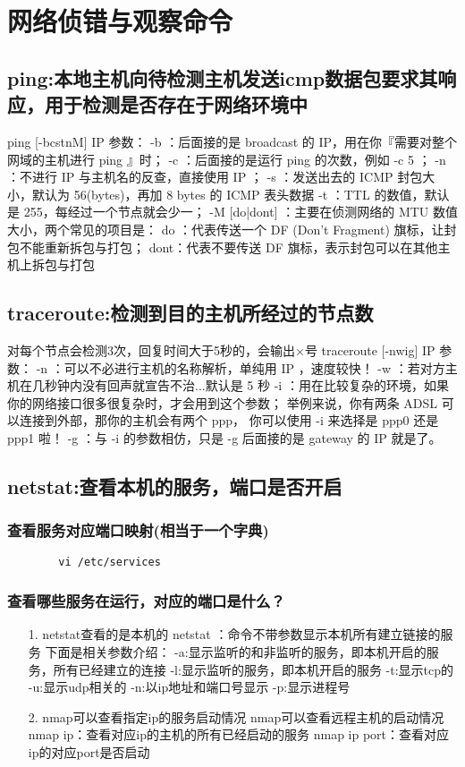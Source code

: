 \documentclass[a4paper,left=1.5cm,right=1.5cm,11pt]{article}
\begin{document}
\section{网络侦错与观察命令}
\subsection{ping:本地主机向待检测主机发送icmp数据包要求其响应，用于检测是否存在于网络环境中}
ping [-bcstnM] IP
参数：
-b ：后面接的是 broadcast 的 IP，用在你『需要对整个网域的主机进行 ping 』时；
-c ：后面接的是运行 ping 的次数，例如 -c 5 ；
-n ：不进行 IP 与主机名的反查，直接使用 IP ；
-s ：发送出去的 ICMP 封包大小，默认为 56(bytes)，再加 8 bytes 的 ICMP 表头数据
-t ：TTL 的数值，默认是 255，每经过一个节点就会少一；
-M [do|dont] ：主要在侦测网络的 MTU 数值大小，两个常见的项目是：
   do  ：代表传送一个 DF (Don't Fragment) 旗标，让封包不能重新拆包与打包；
   dont：代表不要传送 DF 旗标，表示封包可以在其他主机上拆包与打包

\subsection{traceroute:检测到目的主机所经过的节点数}
对每个节点会检测3次，回复时间大于5秒的，会输出×号 
traceroute [-nwig] IP
参数：
-n ：可以不必进行主机的名称解析，单纯用 IP ，速度较快！
-w ：若对方主机在几秒钟内没有回声就宣告不治...默认是 5 秒
-i ：用在比较复杂的环境，如果你的网络接口很多很复杂时，才会用到这个参数；
     举例来说，你有两条 ADSL 可以连接到外部，那你的主机会有两个 ppp，
     你可以使用 -i 来选择是 ppp0 还是 ppp1 啦！
-g ：与 -i 的参数相仿，只是 -g 后面接的是 gateway 的 IP 就是了。

\subsection{netstat:查看本机的服务，端口是否开启}
    \subsubsection{查看服务对应端口映射(相当于一个字典)}
    \begin{lstlisting}
        vi /etc/services
    \end{lstlisting}
    \subsubsection{查看哪些服务在运行，对应的端口是什么？}
    \begin{itemize}
    \item[1.]netstat查看的是本机的
        netstat ：命令不带参数显示本机所有建立链接的服务
        下面是相关参数介绍：
        -a:显示监听的和非监听的服务，即本机开启的服务，所有已经建立的连接
        -l:显示监听的服务，即本机开启的服务
        -t:显示tcp的
        -u:显示udp相关的
        -n:以ip地址和端口号显示
        -p:显示进程号
    \item[2.]nmap可以查看指定ip的服务启动情况
        nmap可以查看远程主机的启动情况
        nmap ip：查看对应ip的主机的所有已经启动的服务
        nmap ip port：查看对应ip的对应port是否启动
    \end{itemize}
\end{document}
